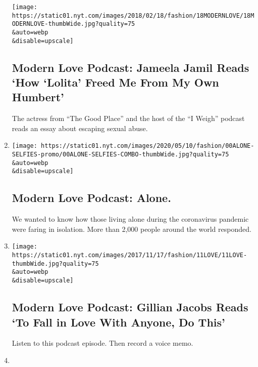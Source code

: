\begin{enumerate}
  \texttt{[image: https://static01.nyt.com/images/2018/02/18/fashion/18MODERNLOVE/18MODERNLOVE-thumbWide.jpg?quality=75\\\&auto=webp\\\&disable=upscale]}

  \hypertarget{modern-love-podcast-jameela-jamil-reads-how-lolita-freed-me-from-my-own-humbert}{%
  \subsection{Modern Love Podcast: Jameela Jamil Reads `How `Lolita'
  Freed Me From My Own
  Humbert'}\label{modern-love-podcast-jameela-jamil-reads-how-lolita-freed-me-from-my-own-humbert}}

  The actress from ``The Good Place'' and the host of the ``I Weigh''
  podcast reads an essay about escaping sexual abuse.
\item
  \href{/2020/05/13/style/modern-love-podcast-coronavirus-living-alone.html}{}

  \texttt{[image: https://static01.nyt.com/images/2020/05/10/fashion/00ALONE-SELFIES-promo/00ALONE-SELFIES-COMBO-thumbWide.jpg?quality=75\\\&auto=webp\\\&disable=upscale]}

  \hypertarget{modern-love-podcast-alone}{%
  \subsection{Modern Love Podcast:
  Alone.}\label{modern-love-podcast-alone}}

  We wanted to know how those living alone during the coronavirus
  pandemic were faring in isolation. More than 2,000 people around the
  world responded.
\item
  \href{/2020/05/06/style/modern-love-podcast-gillian-jacobs.html}{}

  \texttt{[image: https://static01.nyt.com/images/2017/11/17/fashion/11LOVE/11LOVE-thumbWide.jpg?quality=75\\\&auto=webp\\\&disable=upscale]}

  \hypertarget{modern-love-podcast-gillian-jacobs-reads-to-fall-in-love-with-anyone-do-this}{%
  \subsection{Modern Love Podcast: Gillian Jacobs Reads `To Fall in Love
  With Anyone, Do
  This'}\label{modern-love-podcast-gillian-jacobs-reads-to-fall-in-love-with-anyone-do-this}}

  Listen to this podcast episode. Then record a voice memo.
\item
  \href{/2020/04/29/style/modern-love-podcast-daisy-edgar-jones.html}{}


\end{enumerate}
